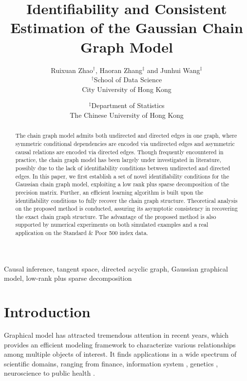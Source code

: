 \documentclass[12pt]{article}
\newcommand{\1}{\uppercase\expandafter{\romannumeral1}}
\newcommand{\2}{\uppercase\expandafter{\romannumeral2}}
\newcommand{\0}{\textbf{0}}
\begin{document}
	
\title{Identifiability and Consistent Estimation of the Gaussian Chain Graph Model}
\author{Ruixuan Zhao$^{\dag}$, Haoran Zhang$^\ddag$ and Junhui Wang$^\ddag$\\ [10pt]
	$^\dag$School of Data Science \\
	City University of Hong Kong 
	\and
	$^\ddag$Department of Statistics \\
	The Chinese University of Hong Kong
}
\date{ }

\maketitle
	
\onehalfspacing
\begin{abstract}
The chain graph model admits both undirected and directed edges in one graph, where symmetric conditional dependencies are encoded via undirected edges and asymmetric causal relations are encoded via directed edges. Though frequently encountered in practice, the chain graph model has been largely under investigated in literature, possibly due to the lack of identifiability conditions between undirected and directed edges. In this paper, we first establish a set of novel identifiability conditions for the Gaussian chain graph model, exploiting a low rank plus sparse decomposition of the precision matrix. Further, an efficient learning algorithm is built upon the identifiability conditions to fully recover the chain graph structure. Theoretical analysis on the proposed method is conducted, assuring its asymptotic consistency in recovering the exact chain graph structure. The advantage of the proposed method is also supported by numerical experiments on both simulated examples and a real application on the Standard \& Poor 500 index data.
\end{abstract}
	
\begin{keywords}
Causal inference, tangent space, directed acyclic graph, Gaussian graphical model, low-rank plus sparse decomposition
\end{keywords}
	

\doublespacing

\section{Introduction}	\label{sec:intro}

Graphical model has attracted tremendous attention in recent years, which provides an efficient modeling framework to characterize various relationships among multiple objects of interest. It finds applications in a wide spectrum of scientific domains, ranging from finance\cite{Sanford2012}, information system \cite{Stanton1995}, genetics \cite{Friedman2008}, neuroscience \cite{Cole2013} to public health \cite{Luke2007}.
\end{document}
